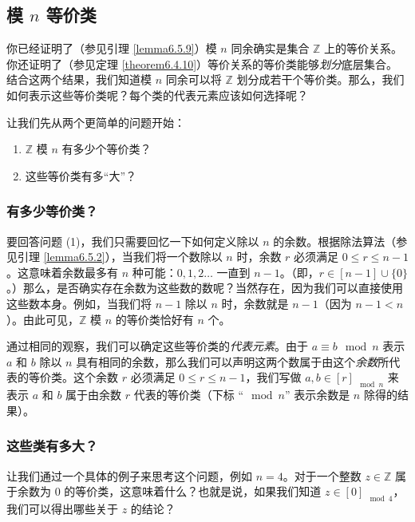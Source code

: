 
\subsection{模 $n$ 等价类}

你已经证明了（参见引理 \ref{lemma6.5.9}）模 $n$ 同余确实是集合 $\mathbb{Z}$ 上的等价关系。你还证明了（参见定理 \ref{theorem6.4.10}）等价关系的等价类能够\emph{划分}底层集合。结合这两个结果，我们知道模 $n$ 同余可以将 $\mathbb{Z}$ 划分成若干个等价类。那么，我们如何表示这些等价类呢？每个类的代表元素应该如何选择呢？

让我们先从两个更简单的问题开始：
\begin{enumerate}[label=(\arabic*)]
    \item $\mathbb{Z}$ 模 $n$ 有多少个等价类？
    \item 这些等价类有多``大''？
\end{enumerate}

\subsubsection*{有多少等价类？}

要回答问题 (1)，我们只需要回忆一下如何定义除以 $n$ 的余数。根据除法算法（参见引理 \ref{lemma6.5.2}），当我们将一个数除以 $n$ 时，余数 $r$ 必须满足 $0 \le r \le n-1$。这意味着余数最多有 $n$ 种可能：$0,1,2 \dots$ 一直到 $n-1$。（即，$r \in [n-1] \cup \{0\}$。）那么，是否确实存在余数为这些数的数呢？当然存在，因为我们可以直接使用这些数本身。例如，当我们将 $n-1$ 除以 $n$ 时，余数就是 $n-1$（因为 $n-1 < n$）。由此可见，$\mathbb{Z}$ 模 $n$ 的等价类恰好有 $n$ 个。

通过相同的观察，我们可以确定这些等价类的\emph{代表元素}。由于 $a \equiv b \mod n$ 表示 $a$ 和 $b$ 除以 $n$ 具有相同的余数，那么我们可以声明这两个数属于由这个\emph{余数}所代表的等价类。这个余数 $r$ 必须满足 $0 \le r \le n-1$，我们写做 $a, b \in [r]_{\mod n}$ 来表示 $a$ 和 $b$ 属于由余数 $r$ 代表的等价类（下标 ``$\mod n$'' 表示余数是 $n$ 除得的结果）。

\subsubsection*{这些类有多大？}

让我们通过一个具体的例子来思考这个问题，例如 $n = 4$。对于一个整数 $z \in \mathbb{Z}$ 属于余数为 $0$ 的等价类，这意味着什么？也就是说，如果我们知道 $z \in [0]_{\mod 4}$，我们可以得出哪些关于 $z$ 的结论？

